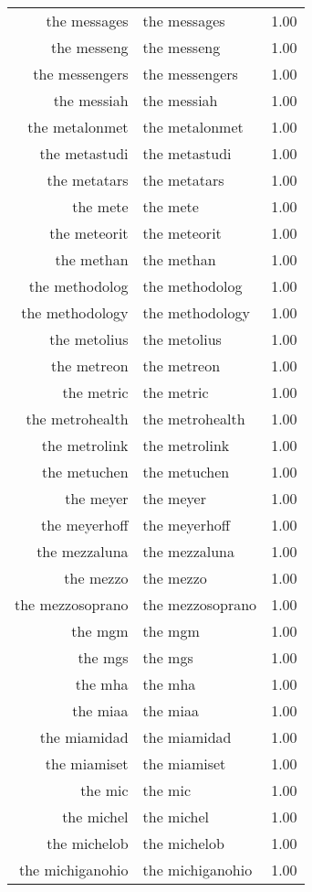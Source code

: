 \begin{table}[ht]
\begin{tabular}{rlr}
  the messages & the messages & 1.00 \\ 
  the messeng & the messeng & 1.00 \\ 
  the messengers & the messengers & 1.00 \\ 
  the messiah & the messiah & 1.00 \\ 
  the metalonmet & the metalonmet & 1.00 \\ 
  the metastudi & the metastudi & 1.00 \\ 
  the metatars & the metatars & 1.00 \\ 
  the mete & the mete & 1.00 \\ 
  the meteorit & the meteorit & 1.00 \\ 
  the methan & the methan & 1.00 \\ 
  the methodolog & the methodolog & 1.00 \\ 
  the methodology & the methodology & 1.00 \\ 
  the metolius & the metolius & 1.00 \\ 
  the metreon & the metreon & 1.00 \\ 
  the metric & the metric & 1.00 \\ 
  the metrohealth & the metrohealth & 1.00 \\ 
  the metrolink & the metrolink & 1.00 \\ 
  the metuchen & the metuchen & 1.00 \\ 
  the meyer & the meyer & 1.00 \\ 
  the meyerhoff & the meyerhoff & 1.00 \\ 
  the mezzaluna & the mezzaluna & 1.00 \\ 
  the mezzo & the mezzo & 1.00 \\ 
  the mezzosoprano & the mezzosoprano & 1.00 \\ 
  the mgm & the mgm & 1.00 \\ 
  the mgs & the mgs & 1.00 \\ 
  the mha & the mha & 1.00 \\ 
  the miaa & the miaa & 1.00 \\ 
  the miamidad & the miamidad & 1.00 \\ 
  the miamiset & the miamiset & 1.00 \\ 
  the mic & the mic & 1.00 \\ 
  the michel & the michel & 1.00 \\ 
  the michelob & the michelob & 1.00 \\ 
  the michiganohio & the michiganohio & 1.00 \\ 

\end{tabular}
\end{table}
